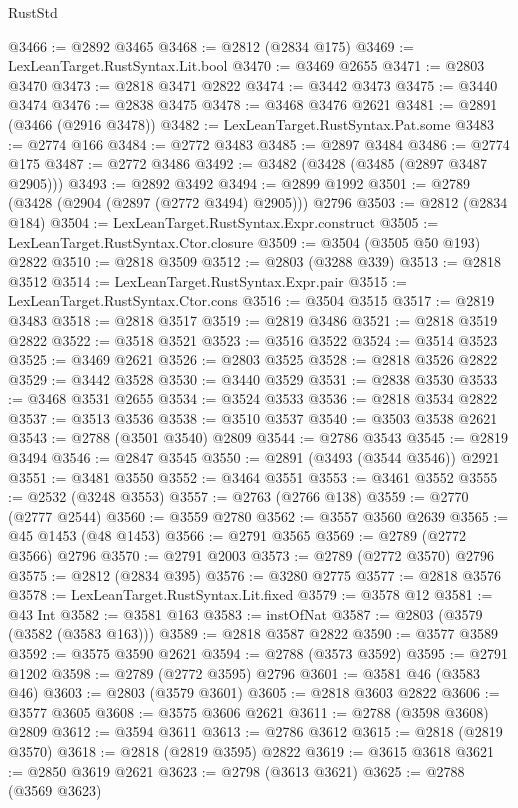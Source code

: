 \begin{lexlean}{RustStd}
\begin{coremodule}
@3466 := @2892 @3465
@3468 := @2812 (@2834 @175)
@3469 := LexLeanTarget.RustSyntax.Lit.bool
@3470 := @3469 @2655
@3471 := @2803 @3470
@3473 := @2818 @3471 @2822
@3474 := @3442 @3473
@3475 := @3440 @3474
@3476 := @2838 @3475
@3478 := @3468 @3476 @2621
@3481 := @2891 (@3466 (@2916 @3478))
@3482 := LexLeanTarget.RustSyntax.Pat.some
@3483 := @2774 @166
@3484 := @2772 @3483
@3485 := @2897 @3484
@3486 := @2774 @175
@3487 := @2772 @3486
@3492 := @3482 (@3428 (@3485 (@2897 @3487 @2905)))
@3493 := @2892 @3492
@3494 := @2899 @1992
@3501 := @2789 (@3428 (@2904 (@2897 (@2772 @3494) @2905))) @2796
@3503 := @2812 (@2834 @184)
@3504 := LexLeanTarget.RustSyntax.Expr.construct
@3505 := LexLeanTarget.RustSyntax.Ctor.closure
@3509 := @3504 (@3505 @50 @193) @2822
@3510 := @2818 @3509
@3512 := @2803 (@3288 @339)
@3513 := @2818 @3512
@3514 := LexLeanTarget.RustSyntax.Expr.pair
@3515 := LexLeanTarget.RustSyntax.Ctor.cons
@3516 := @3504 @3515
@3517 := @2819 @3483
@3518 := @2818 @3517
@3519 := @2819 @3486
@3521 := @2818 @3519 @2822
@3522 := @3518 @3521
@3523 := @3516 @3522
@3524 := @3514 @3523
@3525 := @3469 @2621
@3526 := @2803 @3525
@3528 := @2818 @3526 @2822
@3529 := @3442 @3528
@3530 := @3440 @3529
@3531 := @2838 @3530
@3533 := @3468 @3531 @2655
@3534 := @3524 @3533
@3536 := @2818 @3534 @2822
@3537 := @3513 @3536
@3538 := @3510 @3537
@3540 := @3503 @3538 @2621
@3543 := @2788 (@3501 @3540) @2809
@3544 := @2786 @3543
@3545 := @2819 @3494
@3546 := @2847 @3545
@3550 := @2891 (@3493 (@3544 @3546)) @2921
@3551 := @3481 @3550
@3552 := @3464 @3551
@3553 := @3461 @3552
@3555 := @2532 (@3248 @3553)
@3557 := @2763 (@2766 @138)
@3559 := @2770 (@2777 @2544)
@3560 := @3559 @2780
@3562 := @3557 @3560 @2639
@3565 := @45 @1453 (@48 @1453)
@3566 := @2791 @3565
@3569 := @2789 (@2772 @3566) @2796
@3570 := @2791 @2003
@3573 := @2789 (@2772 @3570) @2796
@3575 := @2812 (@2834 @395)
@3576 := @3280 @2775
@3577 := @2818 @3576
@3578 := LexLeanTarget.RustSyntax.Lit.fixed
@3579 := @3578 @12
@3581 := @43 Int
@3582 := @3581 @163
@3583 := instOfNat
@3587 := @2803 (@3579 (@3582 (@3583 @163)))
@3589 := @2818 @3587 @2822
@3590 := @3577 @3589
@3592 := @3575 @3590 @2621
@3594 := @2788 (@3573 @3592)
@3595 := @2791 @1202
@3598 := @2789 (@2772 @3595) @2796
@3601 := @3581 @46 (@3583 @46)
@3603 := @2803 (@3579 @3601)
@3605 := @2818 @3603 @2822
@3606 := @3577 @3605
@3608 := @3575 @3606 @2621
@3611 := @2788 (@3598 @3608) @2809
@3612 := @3594 @3611
@3613 := @2786 @3612
@3615 := @2818 (@2819 @3570)
@3618 := @2818 (@2819 @3595) @2822
@3619 := @3615 @3618
@3621 := @2850 @3619 @2621
@3623 := @2798 (@3613 @3621)
@3625 := @2788 (@3569 @3623)

\end{coremodule}
\end{lexlean}
